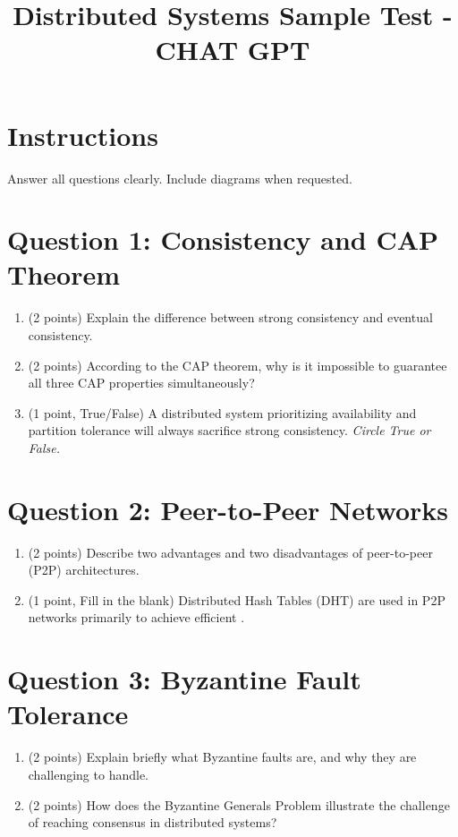 \documentclass[12pt]{article}
\title{Distributed Systems Sample Test - CHAT GPT}
\date{}
\begin{document}
\maketitle

\section*{Instructions}
Answer all questions clearly. Include diagrams when requested.

\section*{Question 1: Consistency and CAP Theorem}
\begin{enumerate}[label=(\alph*)]
    \item (2 points) Explain the difference between strong consistency and eventual consistency.
    \item (2 points) According to the CAP theorem, why is it impossible to guarantee all three CAP properties simultaneously?
    \item (1 point, True/False) A distributed system prioritizing availability and partition tolerance will always sacrifice strong consistency. \textit{Circle True or False.}
\end{enumerate}

\section*{Question 2: Peer-to-Peer Networks}
\begin{enumerate}[label=(\alph*)]
    \item (2 points) Describe two advantages and two disadvantages of peer-to-peer (P2P) architectures.
    \item (1 point, Fill in the blank) Distributed Hash Tables (DHT) are used in P2P networks primarily to achieve efficient \underline{\hspace{3cm}}.
\end{enumerate}

\section*{Question 3: Byzantine Fault Tolerance}
\begin{enumerate}[label=(\alph*)]
    \item (2 points) Explain briefly what Byzantine faults are, and why they are challenging to handle.
    \item (2 points) How does the Byzantine Generals Problem illustrate the challenge of reaching consensus in distributed systems?
\end{enumerate}
\end{document}
